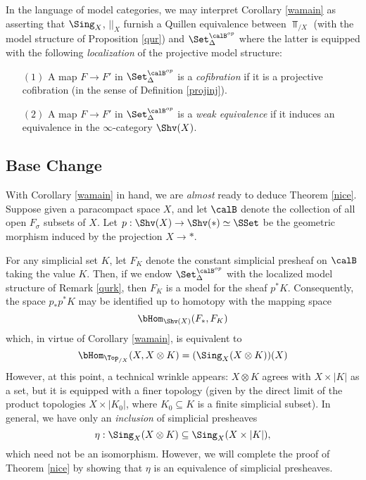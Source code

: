 \begin{remark}\label{qurk}
In the language of model categories, we may interpret Corollary \ref{wamain} as asserting
that $\Sing_X$, $||_X$ furnish a Quillen equivalence between $\Top_{/X}$ (with the model structure of Proposition \ref{qur}) and $\Set_{\Delta}^{\calB^{op}}$ where the latter is equipped with the following {\em localization} of the projective model structure:
\begin{itemize}
\item[$(1)$] A map $F \rightarrow F'$ in $\Set_{\Delta}^{\calB^{op}}$ is a {\it cofibration} if it is a projective cofibration (in the sense of Definition \ref{projinj}).
\item[$(2)$] A map $F \rightarrow F'$ in $\Set_{\Delta}^{\calB^{op}}$ is a {\it weak equivalence} if it induces an
equivalence in the $\infty$-category $\Shv(X)$.
\end{itemize}
\end{remark}

\subsection{Base Change}\label{dooky}

With Corollary \ref{wamain} in hand, we are {\em almost} ready to deduce Theorem \ref{nice}.
Suppose given a paracompact space $X$, and let $\calB$ denote the collection of all
open $F_{\sigma}$ subsets of $X$. Let $p: \Shv(X) \rightarrow \Shv(\ast) \simeq \SSet$ be the geometric morphism induced by the projection $X \rightarrow \ast$.

For any simplicial set $K$, let $F_{K}$ denote the constant simplicial presheaf
on $\calB$ taking the value $K$. Then, if we endow $\Set_{\Delta}^{\calB^{op}}$ with the localized model structure of Remark \ref{qurk}, then $F_K$ is a model for the sheaf $p^{\ast} K$. Consequently, the space $p_{\ast} p^{\ast} K$ may be identified up to homotopy with the mapping space
$$ \bHom_{\Shv(X)}( F_{\ast}, F_{K} )$$
which, in virtue of Corollary \ref{wamain}, is equivalent to
$$ \bHom_{\Top_{/X}}( X, X \otimes K ) = (\Sing_X (X \otimes K))(X)$$
However, at this point, a technical wrinkle appears: $X \otimes K$ agrees with $X \times |K|$ as a set, but it is equipped with a finer topology (given by the direct limit of the product topologies $X \times |K_0|$, where $K_0 \subseteq K$ is a finite simplicial subset). In general, we have only
an {\em inclusion} of simplicial presheaves
$$ \eta: \Sing_X (X \otimes K) \subseteq \Sing_{X} (X \times |K|),$$
which need not be an isomorphism. However, we will complete the proof of Theorem \ref{nice}
by showing that $\eta$ is an equivalence of simplicial presheaves.


